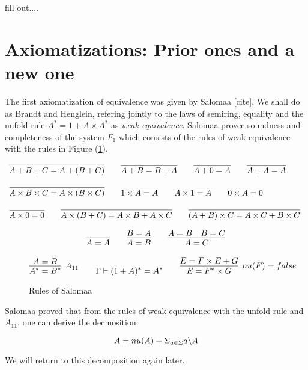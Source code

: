 \documentclass[a4paper,UKenglish,cleveref, autoref, thm-restate]{lipics-v2021}
\begin{document}
\begin{definition}
  fill out....
\end{definition}
\section{Axiomatizations:  Prior ones and a new one}
The first axiomatization of equivalence was given by Salomaa [cite]. We shall do as Brandt and Henglein, refering jointly to the laws of semiring, equality and the unfold rule $A^* = 1 + A \times A^*$ as \textit{weak equivalence}. Salomaa provec soundness and completeness of the system $F_1$ which consists of the rules of weak equivalence with the rules in Figure (\ref{fig:salomaa}).
\begin{definition}
\label{definition:ring}
\begin{displaymath}
\begin{array}{lll}
\myaxiom{A + B + C}{A + (B + C)} \qquad  
\myaxiom{A + B}{B + A} \qquad 
\myaxiom{A + 0}{A} \qquad
\myaxiom{A + A}{A} \qquad
\\\\
\myaxiom{A \times B \times C}{A \times (B \times C)} \qquad
\myaxiom{1 \times A}{A} \qquad
\myaxiom{A \times 1}{A} \qquad 
\myaxiom{0 \times A}{0} \qquad
\\\\
\myaxiom{A \times 0}{0} \qquad
\myaxiom{A \times (B + C)} {A \times B + A \times C} \qquad
\myaxiom{(A + B)\times C}{A \times C + B \times C}
\end{array}
\end{displaymath}
\end{definition}

\begin{definition}
\label{definition:equality}
\begin{displaymath}
\begin{array}{lll}
\infer{A = A}{}\qquad
\infer{A = B}{B = A}\qquad
\infer{A = C}{A = B & B = C}
\end{array}
\end{displaymath}
\end{definition}
\begin{figure}
\caption{Rules of Salomaa}
\label{fig:salomaa}
\begin{displaymath}
\infer[A_{11}]{\eqBodyE{A^*}{B^*}}
  {\eqBodyE{A}{B}} \qquad
\myaxiomN{(1 + A)^*}{A^*} \qquad \infer[\mynu{F}=\false]{\eqBodyE{E}{F^* \times G}}{\eqBodyE{E}{F \times E + G}}
\end{displaymath}
\end{figure}
Salomaa proved that from the rules of weak equivalence with the unfold-rule and $A_{11}$, one can derive the decmosition:
\begin{lemma}
\[A = \mynu{A} + \Sigma_{a \in \Sigma} \derive{a}{A}\]
\end{lemma}
We will return to this decomposition again later.
\end{document}
